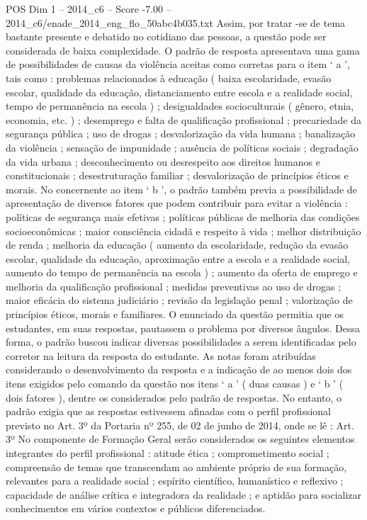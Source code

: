\begin{textsample}{POS Dim 1 – 2014\_c6 – Score -7.00 – 2014\_c6/enade\_2014\_eng\_flo\_50abc4b035.txt}
Assim, por tratar -se de tema bastante presente e debatido no cotidiano das pessoas, a questão pode ser considerada de baixa complexidade.
O padrão de resposta apresentava uma gama de possibilidades de causas da violência aceitas como corretas para o item ‘ a ’, tais como : problemas relacionados à educação ( baixa escolaridade, evasão escolar, qualidade da educação, distanciamento entre escola e a realidade social, tempo de permanência na escola ) ; desigualdades socioculturais ( gênero, etnia, economia, etc. ) ; desemprego e falta de qualificação profissional ; precariedade da segurança pública ; uso de drogas ; desvalorização da vida humana ; banalização da violência ; sensação de impunidade ; ausência de políticas sociais ; degradação da vida urbana ; desconhecimento ou desrespeito aos direitos humanos e constitucionais ; desestruturação familiar ; desvalorização de princípios éticos e morais.
No concernente ao item ‘ b ’, o padrão também previa a possibilidade de apresentação de diversos fatores que podem contribuir para evitar a violência : políticas de segurança mais efetivas ; políticas públicas de melhoria das condições socioeconômicas ; maior consciência cidadã e respeito à vida ; melhor distribuição de renda ; melhoria da educação ( aumento da escolaridade, redução da evasão escolar, qualidade da educação, aproximação entre a escola e a realidade social, aumento do tempo de permanência na escola ) ; aumento da oferta de emprego e melhoria da qualificação profissional ; medidas preventivas ao uso de drogas ; maior eficácia do sistema judiciário ; revisão da legislação penal ; valorização de princípios éticos, morais e familiares.
O enunciado da questão permitia que os estudantes, em suas respostas, pautassem o problema por diversos ângulos.
Dessa forma, o padrão buscou indicar diversas possibilidades a serem identificadas pelo corretor na leitura da resposta do estudante.
As notas foram atribuídas considerando o desenvolvimento da resposta e a indicação de ao menos dois dos itens exigidos pelo comando da questão nos itens ‘ a ’ ( duas causas ) e ‘ b ’ ( dois fatores ), dentre os considerados pelo padrão de respostas.
No entanto, o padrão exigia que as respostas estivessem afinadas com o perfil profissional previsto no Art. 3º da Portaria nº 255, de 02 de junho de 2014, onde se lê : Art. 3º No componente de Formação Geral serão considerados os seguintes elementos integrantes do perfil profissional : atitude ética ; comprometimento social ; compreensão de temas que transcendam ao ambiente próprio de sua formação, relevantes para a realidade social ; espírito científico, humanístico e reflexivo ; capacidade de análise crítica e integradora da realidade ; e aptidão para socializar conhecimentos em vários contextos e públicos diferenciados.

\end{textsample}
